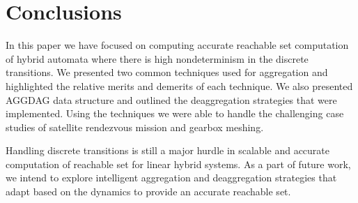 \documentclass[sigconf]{acmart}
\begin{document}
%
%

%


%

%
\maketitle

%
%
%






\section{Conclusions}
In this paper we have focused on computing accurate reachable set computation of hybrid automata where there is high nondeterminism in the discrete transitions. We presented two common techniques used for aggregation and highlighted the relative merits and demerits of each technique. We also presented AGGDAG data structure and outlined the deaggregation strategies that were implemented. Using the techniques we were able to handle the challenging case studies of satellite rendezvous mission and gearbox meshing.

Handling discrete transitions is still a major hurdle in scalable and accurate computation of reachable set for linear hybrid systems. As a part of future work, we intend to explore intelligent aggregation and deaggregation strategies that adapt based on the dynamics to provide an accurate reachable set.




\end{document}
